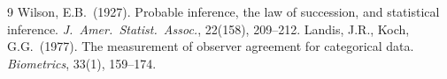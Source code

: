 \documentclass[11pt,twocolumn]{article}
\begin{document}
\begin{thebibliography}{9}
\setlength{\itemsep}{0pt}
  Wilson, E.B.\ (1927). Probable inference, the law of succession, and statistical inference. \textit{J.\ Amer.\ Statist.\ Assoc.}, 22(158), 209--212.
  Landis, J.R., Koch, G.G.\ (1977). The measurement of observer agreement for categorical data. \textit{Biometrics}, 33(1), 159--174.
 
\end{thebibliography}
 
\end{document}
